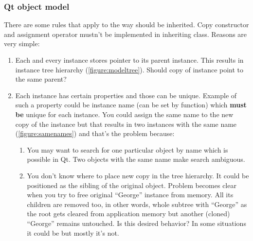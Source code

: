 \subsubsection{Qt object model}\label{section:model}
There are some rules that apply to the way should be inherited. Copy constructor and assignment operator mustn't be implemented in inheriting class. Reasons are very simple:
\begin{enumerate}
\item Each and every instance stores pointer to its parent instance. This results in instance tree hierarchy (\autoref{figure:modeltree}). Should copy of instance point to the same parent?

\item Each instance has certain properties and those can be unique. Example of such a property could be instance name (can be set by function) which \textbf{must be} unique for each instance. You could assign the same name to the new copy of the instance but that results in two instances with the same name (\autoref{figure:samenames}) and that's the problem because:
\begin{enumerate}
\item You may want to search for one particular object by name which is possible in Qt. Two objects with the same name make search ambiguous.
\item You don't know where to place new copy in the tree hierarchy. It could be positioned as the sibling of the original object. Problem becomes clear when you try to free original \enquote{George} instance from memory. All its children are removed too, in other words, whole subtree with \enquote{George} as the root gets cleared from application memory but another (cloned) \enquote{George} remains untouched. Is this desired behavior? In some situations it could be but mostly it's not.
\end{enumerate}
\end{enumerate}

